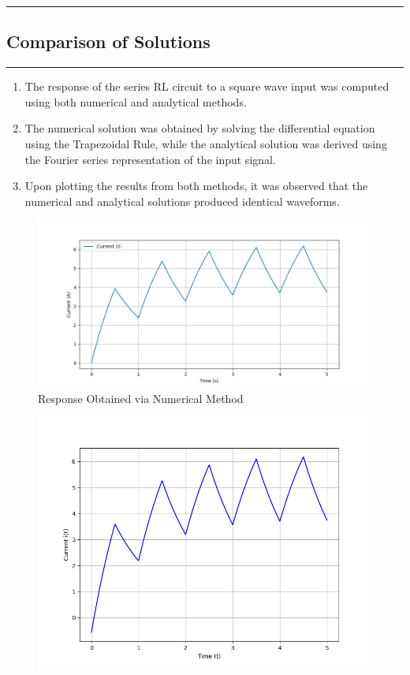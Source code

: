 \newpage
{\color{gray}\hrule}
\begin{center}
\section{Comparison of Solutions}
\bigskip
\end{center}
{\color{gray}\hrule}
\begin{multicols}{2}

\begin{enumerate}
    \item The response of the series RL circuit to a square wave input was computed using both numerical and analytical methods. 
    \item The numerical solution was obtained by solving the differential equation using the Trapezoidal Rule, while the analytical solution was derived using the Fourier series representation of the input signal.
    \item Upon plotting the results from both methods, it was observed that the numerical and analytical solutions produced identical waveforms. 
\end{enumerate}
\begin{figure}[H]
  \centering
  \includegraphics[width=\columnwidth]{sections/4_og.png}
  \caption{Response Obtained via Numerical Method}
\end{figure}
\begin{figure}[H]
  \centering
  \includegraphics[width=\columnwidth]{sections/5_Analytical.png}

\end{figure}
\end{multicols}
